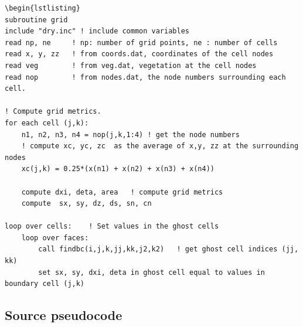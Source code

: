 \documentclass{article}
\begin{document}
\begin{lstlisting}
\begin{lstlisting}
subroutine grid
include "dry.inc" ! include common variables 
read np, ne 	! np: number of grid points, ne : number of cells
read x, y, zz	! from coords.dat, coordinates of the cell nodes
read veg        ! from veg.dat, vegetation at the cell nodes	
read nop		! from nodes.dat, the node numbers surrounding each cell.

! Compute grid metrics.
for each cell (j,k):
	n1, n2, n3, n4 = nop(j,k,1:4) ! get the node numbers
	! compute xc, yc, zc  as the average of x,y, zz at the surrounding nodes
	xc(j,k) = 0.25*(x(n1) + x(n2) + x(n3) + x(n4))  

	compute dxi, deta, area   ! compute grid metrics
	compute  sx, sy, dz, ds, sn, cn			
	
loop over cells:	! Set values in the ghost cells
	loop over faces:	
		call findbc(i,j,k,jj,kk,j2,k2)   ! get ghost cell indices (jj, kk)
		set sx, sy, dxi, deta in ghost cell equal to values in boundary cell (j,k)
\end{lstlisting}

\subsection{Source pseudocode }
\end{document}
